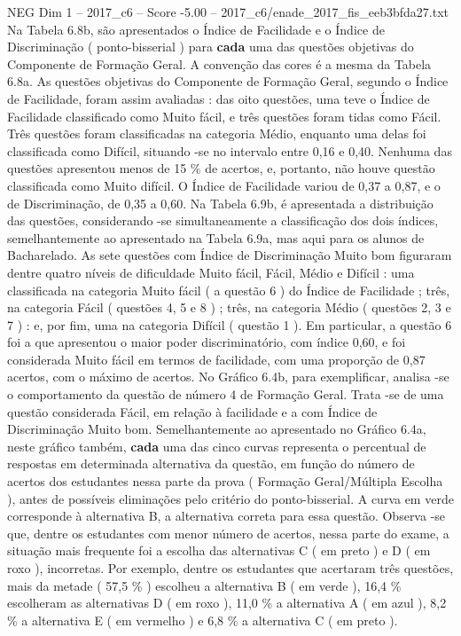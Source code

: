 \begin{textsample}{NEG Dim 1 – 2017\_c6 – Score -5.00 – 2017\_c6/enade\_2017\_fis\_eeb3bfda27.txt}
Na Tabela 6.8b, são apresentados o Índice de Facilidade e o Índice de Discriminação ( ponto-bisserial ) para \textbf{cada} uma das questões objetivas do Componente de Formação Geral.
A convenção das cores é a mesma da Tabela 6.8a.
As questões objetivas do Componente de Formação Geral, segundo o Índice de Facilidade, foram assim avaliadas : das oito questões, uma teve o Índice de Facilidade classificado como Muito fácil, e três questões foram tidas como Fácil.
Três questões foram classificadas na categoria Médio, enquanto uma delas foi classificada como Difícil, situando -se no intervalo entre 0,16 e 0,40.
Nenhuma das questões apresentou menos de 15 \% de acertos, e, portanto, não houve questão classificada como Muito difícil.
O Índice de Facilidade variou de 0,37 a 0,87, e o de Discriminação, de 0,35 a 0,60.
Na Tabela 6.9b, é apresentada a distribuição das questões, considerando -se simultaneamente a classificação dos dois índices, semelhantemente ao apresentado na Tabela 6.9a, mas aqui para os alunos de Bacharelado.
As sete questões com Índice de Discriminação Muito bom figuraram dentre quatro níveis de dificuldade Muito fácil, Fácil, Médio e Difícil : uma classificada na categoria Muito fácil ( a questão 6 ) do Índice de Facilidade ; três, na categoria Fácil ( questões 4, 5 e 8 ) ; três, na categoria Médio ( questões 2, 3 e 7 ) : e, por fim, uma na categoria Difícil ( questão 1 ).
Em particular, a questão 6 foi a que apresentou o maior poder discriminatório, com índice 0,60, e foi considerada Muito fácil em termos de facilidade, com uma proporção de 0,87 acertos, com o máximo de acertos.
No Gráfico 6.4b, para exemplificar, analisa -se o comportamento da questão de número 4 de Formação Geral.
Trata -se de uma questão considerada Fácil, em relação à facilidade e a com Índice de Discriminação Muito bom.
Semelhantemente ao apresentado no Gráfico 6.4a, neste gráfico também, \textbf{cada} uma das cinco curvas representa o percentual de respostas em determinada alternativa da questão, em função do número de acertos dos estudantes nessa parte da prova ( Formação Geral/Múltipla Escolha ), antes de possíveis eliminações pelo critério do ponto-bisserial.
A curva em verde corresponde à alternativa B, a alternativa correta para essa questão.
Observa -se que, dentre os estudantes com menor número de acertos, nessa parte do exame, a situação mais frequente foi a escolha das alternativas C ( em preto ) e D ( em roxo ), incorretas.
Por exemplo, dentre os estudantes que acertaram três questões, mais da metade ( 57,5 \% ) escolheu a alternativa B ( em verde ), 16,4 \% escolheram as alternativas D ( em roxo ), 11,0 \% a alternativa A ( em azul ), 8,2 \% a alternativa E ( em vermelho ) e 6,8 \% a alternativa C ( em preto ).

\end{textsample}
